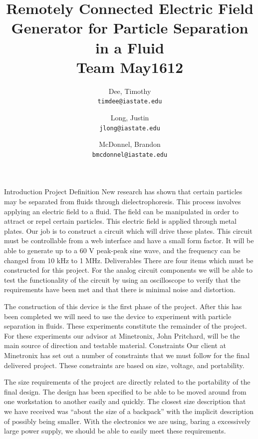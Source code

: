 \documentclass{article}	%
\author{Dee, Timothy\\
    \texttt{timdee@iastate.edu}
    \and
    Long, Justin\\
    \texttt{jlong@iastate.edu}
    \and
    McDonnel, Brandon\\
    \texttt{bmcdonnel@iastate.edu}
}
\title{Remotely Connected Electric Field Generator for Particle Separation in a Fluid \\
Team May1612}
\begin{document}
\thispagestyle{empty}		%
\maketitle			%

\begin{multicols}{2}

\abstract{
}

\section{}

%
%
Introduction
Project Definition
New research has shown that certain particles may be separated from fluids through dielectrophoresis. This process involves applying an electric field to a fluid. The field can be manipulated in order to attract or repel certain particles. This electric field is applied through metal plates. Our job is to construct a circuit which will drive these plates. This circuit must be controllable from a web interface and have a small form factor. It will be able to generate up to a 60 V peak-peak sine wave, and the frequency can be changed from 10 kHz to 1 MHz. 
Deliverables
There are four items which must be constructed for this project. 
For the analog circuit components we will be able to test the functionality of the circuit by using an oscilloscope to verify that the requirements have been met and that there is minimal noise and distortion. 

The construction of this device is the first phase of the project. After this has been completed we will need to use the device to experiment with particle separation in fluids. These experiments constitute the remainder of the project. For these experiments our advisor at Minetronix, John Pritchard, will be the main source of direction and testable material. 
Constraints
Our client at Minetronix has set out a number of constraints that we must follow for the final delivered project. These constraints are based on size, voltage, and portability.

The size requirements of the project are directly related to the portability of the final design. The design has been specified to be able to be moved around from one workstation to another easily and quickly. The closest size description that we have received was “about the size of a backpack” with the implicit description of possibly being smaller. With the electronics we are using, baring a excessively large power supply, we should be able to easily meet these requirements.


\end{multicols}
\end{document}
